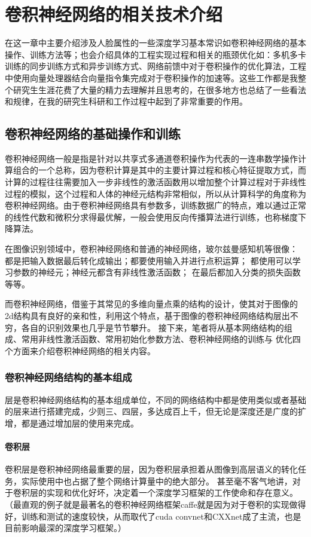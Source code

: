 \chapter {卷积神经网络的相关技术介绍}
在这一章中主要介绍涉及人脸属性的一些深度学习基本常识如卷积神经网络的基本操作、训练方法等；也会介绍具体的工程实现过程和相关的瓶颈优化如：多机多卡训练的同步训练方式和异步训练方式、网络前馈中对于卷积操作的优化算法，工程中使用向量处理器结合向量指令集完成对于卷积操作的加速等。这些工作都是我整个研究生生涯花费了大量的精力去理解并且思考的，在很多地方也总结了一些看法和规律，在我的研究生科研和工作过程中起到了非常重要的作用。

\section{卷积神经网络的基础操作和训练}
卷积神经网络一般是指是针对以共享式多通道卷积操作为代表的一连串数学操作计算组合的一个总称，因为卷积计算是其中的主要计算过程和核心特征提取方式，而计算的过程往往需要加入一步非线性的激活函数用以增加整个计算过程对于非线性过程的模拟，这个过程和人体的神经元结构非常相似，所以从计算科学的角度称为卷积神经网络。由于卷积神经网络具有参数多，训练数据广的特点，难以通过正常的线性代数和微积分求得最优解，一般会使用反向传播算法\cite{BP}进行训练，也称梯度下降算法。

在图像识别领域中，卷积神经网络和普通的神经网络，玻尔兹曼感知机等很像：
都是把输入数据最后转化成输出；都要使用输入并进行点积运算；
都使用可以学习参数的神经元；神经元都含有非线性激活函数；
在最后都加入分类的损失函数等等。

而卷积神经网络，借鉴于其常见的多维向量点乘的结构的设计，使其对于图像的2d结构具有良好的亲和性，利用这个特点，基于图像的卷积神经网络结构层出不穷，各自的识别效果也几乎是节节攀升。 
接下来，笔者将从基本网络结构的组成、常用非线性激活函数、常用初始化参数方法、卷积神经网络的训练与 优化四个方面来介绍卷积神经网络的相关内容。
\subsection{卷积神经网络结构的基本组成}
层是卷积神经网络结构的基本组成单位，不同的网络结构中都是使用类似或者基础的层来进行搭建完成，少则三、四层，多达成百上千，但无论是深度还是广度的扩增，都是通过增加层的使用来完成。
\subsubsection{卷积层}
卷积层\cite{ALEXNET}是卷积神经网络最重要的层，因为卷积层承担着从图像到高层语义的转化任务，实际使用中也占据了整个网络计算量中的绝大部分。
甚至毫不客气地讲，对于卷积层的实现和优化好坏，决定着一个深度学习框架的工作使命和存在意义。（最直观的例子就是最著名的卷积神经网络框架caffe\cite{CAFFE}就是因为对于卷积的实现做得好，训练和测试的速度较快，从而取代了cuda convnet和CXXnet成了主流，也是目前影响最深的深度学习框架。）

